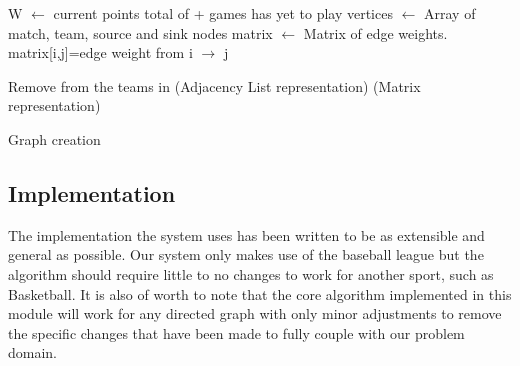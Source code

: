 \begin{algorithm}[H]
     
    
   
    
   
  W $\leftarrow$ current points total of \T + games \T has yet to play\;
  vertices $\leftarrow$ Array of match, team, source and sink nodes\;
  matrix $\leftarrow$ Matrix of edge weights. matrix[i,j]=edge weight from i $\rightarrow$ j\;

  \BlankLine
  Remove \T from the teams in \D\;
  \BlankLine
  \Begin(Adjacency List representation){
    }
    \Begin(Matrix representation){
      }
    \caption{Graph creation}\label{FFGRA}
\end{algorithm} \DecMargin{2em}

\subsection{Implementation}

The implementation the system uses has been written to be as extensible and
general as possible. Our system only makes use of the baseball league but the
algorithm should require little to no changes to work for another sport, such
as Basketball. It is also of worth to note that the core algorithm
implemented in this module will work for any directed graph with only
minor adjustments to remove the specific changes that have been made
to fully couple with our problem domain.

